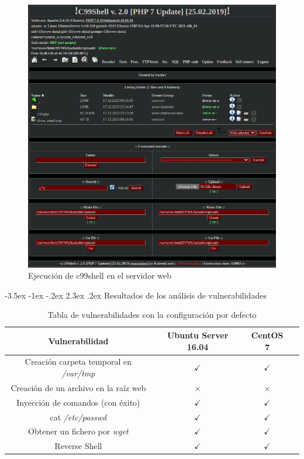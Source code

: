 \documentclass[11pt]{report}
\makeatletter
\renewcommand\chapter{\@startsection{chapter}{0}{\z@}%
    {-3.5ex \@plus -1ex \@minus -.2ex}%
    {2.3ex \@plus.2ex}%
    {\normalfont\Large\bfseries}}
\makeatother
\begin{document}
\begin{itemize}
        \begin{figure}[H]
          \centering
          \includegraphics[scale=0.36]{img/UbuntuServer/UbuntuServer_Base_7_c99shell_ejecution.png}
          \caption{Ejecución de c99shell en el servidor web}
        \end{figure}
\end{itemize}

\chapter{Resultados de los análisis de vulnerabilidades}
\begin{table}[H]
  \centering
  \begin{tabular}{|c|c|c|c|}
    \hline
    \textbf{Vulnerabilidad}                      & \textbf{Ubuntu Server 16.04} & \textbf{CentOS 7} \\ \hline
    Creación carpeta temporal en \emph{/var/tmp} & $\checkmark$                 & $\checkmark$      \\ \hline
    Creación de un archivo en la raíz web        & $\times$                     & $\times$          \\ \hline
    Inyección de comandos (con éxito)            & $\checkmark$                 & $\checkmark$      \\ \hline
    cat \emph{/etc/passwd}                       & $\checkmark$                 & $\checkmark$      \\ \hline
    Obtener un fichero por \emph{wget}           & $\checkmark$                 & $\checkmark$      \\ \hline
    Reverse Shell                                & $\checkmark$                 & $\checkmark$      \\ \hline
  \end{tabular}
  \caption{Tabla de vulnerabilidades con la configuración por defecto}
\end{table}
\end{document}
